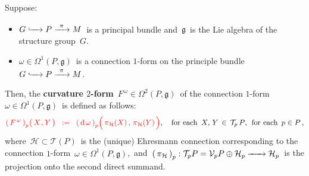 \begin{definition}
\mbox{}
\vskip 0.1cm
\noindent
Suppose:
\begin{itemize}
\item
	\vskip -0.2cm
	$G \xhookrightarrow{{\color{white}222}} P \xrightarrow{{\color{white}2}\pi{\color{white}2}} M$\,
	is a principal bundle and
	\,$\mathfrak{g}$\, is the Lie algebra of the structure group \,$G$.\,
\item
	\vskip -0.1cm
	$\omega \in \Omega^{1}(P,\mathfrak{g})$\, is a connection $1$-form on the principle bundle
	$G \xhookrightarrow{{\color{white}222}} P \xrightarrow{{\color{white}2}\pi{\color{white}2}} M$.\,
\end{itemize}
Then, the \textbf{curvature $2$-form} \,$F^{\,\omega} \in \Omega^{2}(P,\mathfrak{g})$\,
of the connection $1$-form
\,$\omega \in \Omega^{1}(P,\mathfrak{g})$\,
is defined as follows:
\begin{equation*}
{\color{red}
\left(\,F^{\,\omega}\,\right)_{p}\!\left(\,X\overset{{\color{white}1}}{,}\,Y\,\right)
\;\; := \;\;
	\left(\,\d\,\omega\,\right)_{p}\!\left(\,
		\overset{{\color{white}.}}{\pi_{\mathcal{H}}(X)}
		\,,\,
		\pi_{\mathcal{H}}(Y)
		\,\right)
	},
	\quad
	\textnormal{for each \,$X,\,Y\,\in\,\mathcal{T}_{p}\,P$,\; for each \,$p \in P$}\,,
\end{equation*}
where \,$\mathcal{H} \subset \mathcal{T}(P)$\, is the (unique) Ehresmann connection
corresponding to the connection $1$-form \,$\omega \in \Omega^{1}(P,\mathfrak{g})$,\, and
\,$
\left(\,\pi_{\mathcal{H}}\,\right)_{p} :
	\mathcal{T}_{p}P =
	\mathcal{V}_{p}P \oplus \mathcal{H}_{p}
	\xrightarrow{{\color{white}2222}}
	\mathcal{H}_{p}
	$\,
is the projection onto the second direct summand.
\end{definition}

